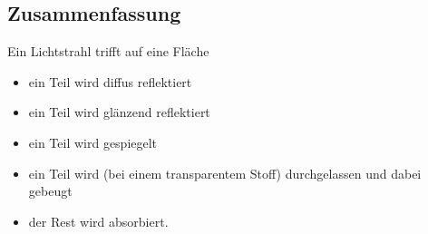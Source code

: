 \subsection{Zusammenfassung}
\begin{center}
\end{center}
Ein Lichtstrahl trifft auf eine Fläche
\begin{itemize}
 \item ein Teil wird diffus reflektiert
 \item ein Teil wird glänzend reflektiert
 \item ein Teil wird gespiegelt
 \item ein Teil wird (bei einem transparentem Stoff) durchgelassen und dabei gebeugt
 \item der Rest wird absorbiert.
\end{itemize}


